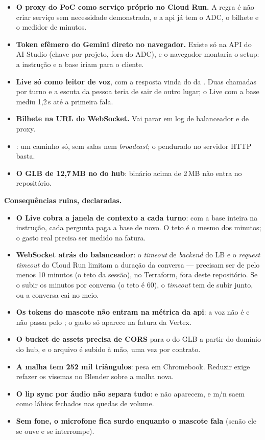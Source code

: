 \begin{itemize}
  \item \textbf{O proxy do PoC como serviço próprio no Cloud Run.} A regra é
    não criar serviço sem necessidade demonstrada, e a api já tem o ADC, o
    bilhete e o medidor de minutos.
  \item \textbf{Token efêmero do Gemini direto no navegador.} Existe só na API
    do AI Studio (chave por projeto, fora do ADC), e o navegador montaria o
    setup: a instrução e a base iriam para o cliente.
  \item \textbf{Live só como leitor de voz}, com a resposta vinda do
     da . Duas chamadas por turno e a
    escuta da pessoa teria de sair de outro lugar; o Live com a base mediu
    1,2\,s até a primeira fala.
  \item \textbf{Bilhete na URL do WebSocket.} Vai parar em log de balanceador
    e de proxy.
  \item \textbf{}: um caminho só, sem salas nem
    \emph{broadcast}; o  pendurado no servidor HTTP basta.
  \item \textbf{O GLB de 12,7\,MB no  do hub}: binário acima de
    2\,MB não entra no repositório.
\end{itemize}

\textbf{Consequências ruins, declaradas.}

\begin{itemize}
  \item \textbf{O Live cobra a janela de contexto a cada turno}: com a base
    inteira na instrução, cada pergunta paga a base de novo. O teto é o mesmo
    dos minutos; o gasto real precisa ser medido na fatura.
  \item \textbf{WebSocket atrás do balanceador}: o \emph{timeout} de
    \emph{backend} do LB e o \emph{request timeout} do Cloud Run limitam a
    duração da conversa --- precisam ser de pelo menos 10 minutos (o teto da
    sessão), no Terraform, fora deste repositório. Se o  subir os
    minutos por conversa (o teto é 60), o \emph{timeout} tem de subir junto,
    ou a conversa cai no meio.
  \item \textbf{Os tokens do mascote não entram na métrica da api}: a voz não
    é  e não passa pelo ; o gasto só
    aparece na fatura da Vertex.
  \item \textbf{O bucket de assets precisa de CORS} para o  do GLB
    a partir do domínio do hub, e o arquivo é subido à mão, uma vez por
    contrato.
  \item \textbf{A malha tem 252 mil triângulos}: pesa em Chromebook. Reduzir
    exige refazer os visemas no Blender sobre a malha nova.
  \item \textbf{O lip sync por áudio não separa tudo}:  e  não
    aparecem, e m/n saem como lábios fechados nas quedas de volume.
  \item \textbf{Sem fone, o microfone fica surdo enquanto o mascote fala}
    (senão ele se ouve e se interrompe).
\end{itemize}

